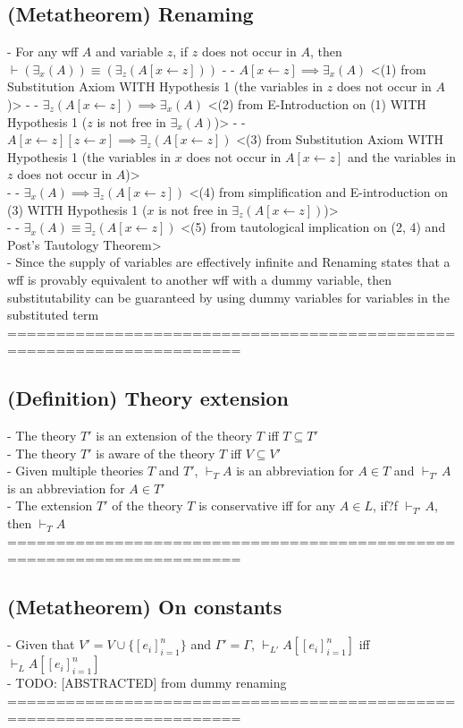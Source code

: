 \documentclass{article}
\begin{document}
\subsection{(Metatheorem) Renaming}
	- For any wff $A$ and variable $z$, if $z$ does not occur in $A$, then $\vdash (\exists_x(A)) \equiv (\exists_z(A[x \leftarrow z]))$
		- - $A[x \leftarrow z] \implies \exists_x(A)$ <(1) from Substitution Axiom WITH Hypothesis 1 (the variables in $z$ does not occur in $A$)>
		- - $\exists_z(A[x \leftarrow z]) \implies \exists_x(A)$ <(2) from E-Introduction on (1) WITH Hypothesis 1 ($z$ is not free in $\exists_x(A)$)>
		- - $A[x \leftarrow z][z \leftarrow x] \implies \exists_z(A[x \leftarrow z])$ <(3) from Substitution Axiom WITH Hypothesis 1 (the variables in $x$ does not occur in $A[x \leftarrow z]$ and the variables in $z$ does not occur in $A$)> \\
		- - $\exists_x(A) \implies \exists_z(A[x \leftarrow z])$ <(4) from simplification and E-introduction on (3) WITH Hypothesis 1 ($x$ is not free in $\exists_z(A[x \leftarrow z])$)> \\
		- - $\exists_x(A) \equiv \exists_z(A[x \leftarrow z])$ <(5) from tautological implication on (2, 4) and Post's Tautology Theorem> \\
	- Since the supply of variables are effectively infinite and Renaming states that a wff is provably equivalent to another wff with a dummy variable, then substitutability can be guaranteed by using dummy variables for variables in the substituted term \\
	======================================================================
\subsection{(Definition) Theory extension}
	- The theory $T'$ is an extension of the theory $T$ iff $T \subseteq T'$ \\
	- The theory $T'$ is aware of the theory $T$ iff $V \subseteq V'$ \\
	- Given multiple theories $T$ and $T'$, $\vdash_T A$ is an abbreviation for $A \in T$ and $\vdash_{T'} A$ is an abbreviation for $A \in T'$ \\
	- The extension $T'$ of the theory $T$ is conservative iff for any $A \in L$, if?f $\vdash_{T'} A$, then $\vdash_T A$ \\
	======================================================================
\subsection{(Metatheorem) On constants}
	- Given that $V' = V \cup \{[e_i]_{i=1}^n\}$ and $\Gamma' = \Gamma$, $\vdash_{L'} A[[e_i]_{i=1}^n]$ iff $\vdash_L A[[e_i]_{i=1}^n]$\\
	- TODO: [ABSTRACTED] from dummy renaming
	======================================================================
\end{document}
